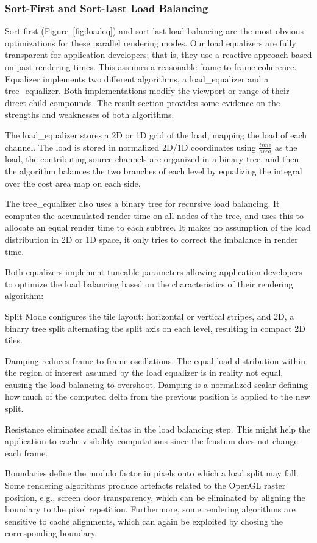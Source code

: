 \documentclass[10pt,journal,compsoc]{IEEEtran}
\newcommand{\fig}[1]{Figure~\ref{#1}}
\providecommand{\DIFaddtex}[1]{{\protect\color{blue} \sf #1}} %
\providecommand{\DIFaddbegin}{} %
\providecommand{\DIFaddend}{} %
\providecommand{\DIFadd}[1]{\texorpdfstring{\DIFaddtex{#1}}{#1}} %
\newcommand{\DIFaddincludegraphics}[2][]{{\color{blue}\fbox{\DIFOincludegraphics[#1]{#2}}}} %
\DeclareRobustCommand{\DIFaddbegin}{\DIFOaddbegin \let\includegraphics\DIFaddincludegraphics} %
\DeclareRobustCommand{\DIFaddend}{\DIFOaddend \let\includegraphics\DIFOincludegraphics} %
\begin{document}
\subsubsection{Sort-First and Sort-Last Load Balancing}

Sort-first (\fig{fig:loadeq}) and sort-last load balancing are the most obvious
optimizations for these parallel rendering modes. Our load equalizers are fully
transparent for application developers; that is, they use a reactive approach
based on past rendering times. This assumes a reasonable frame-to-frame
coherence. Equalizer implements two different algorithms, a
\textsf{load\_equalizer} and a \textsf{tree\_equalizer}. \DIFaddbegin \DIFadd{Both implementations
modify the \textsf{viewport} or \textsf{range} of their direct child compounds.
}\DIFaddend The result section provides some evidence on the strengths and weaknesses of
both algorithms.

The \textsf{load\_equalizer} stores a 2D or 1D grid of the load, mapping the
load of each channel. The load is stored in normalized 2D/1D coordinates using
$\frac{time}{area}$ as the load, the contributing source channels are organized
in a binary tree, and then the algorithm balances the two branches of each level
by equalizing the integral over the cost area map on each side.

The \textsf{tree\_equalizer} also uses a binary tree for recursive load
balancing. It computes the accumulated render time on all nodes of the tree, and
uses this to allocate an equal render time to each subtree. It makes no
assumption of the load distribution in 2D or 1D space, it only tries to correct
the imbalance in render time.

Both equalizers implement tuneable parameters allowing application developers to
optimize the load balancing based on the characteristics of their rendering
algorithm:

\begin{compactdesc}
\item[Split Mode] configures the tile layout: horizontal or vertical stripes,
and 2D, a binary tree split alternating the split axis on each level, resulting
in compact 2D tiles.
\item[Damping] reduces frame-to-frame oscillations. The equal load distribution
within the region of interest assumed by the load equalizer is in reality not
equal, causing the load balancing to overshoot. Damping is a normalized scalar
defining how much of the computed delta from the previous position is applied to
the new split.
\item[Resistance] eliminates small deltas in the load balancing step. This might
help the application to cache visibility computations since the frustum does not
change each frame.
\item[Boundaries] define the modulo factor in pixels onto which a load split may
fall. Some rendering algorithms produce artefacts related to the OpenGL raster
position, e.g., screen door transparency, which can be eliminated by aligning
the boundary to the pixel repetition. Furthermore, some rendering algorithms are
sensitive to cache alignments, which can again be exploited by chosing the
corresponding boundary.
\end{compactdesc}
\end{document}
